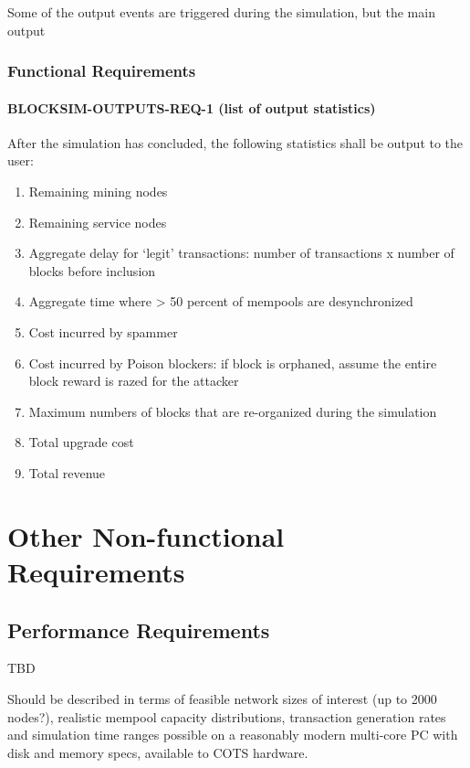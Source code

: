 \documentclass{scrreprt}
\begin{document}
Some of the output events are triggered during the simulation, but the
main output


\subsection{Functional Requirements}


\subsubsection{BLOCKSIM-OUTPUTS-REQ-1 (list of output statistics)}

After the simulation has concluded, the following statistics shall be output
to the user:

\begin{enumerate}
\item Remaining mining nodes
\item Remaining service nodes
\item Aggregate delay for `legit' transactions: number of transactions x number of blocks before inclusion
\item Aggregate time where > 50 percent of mempools are desynchronized
\item Cost incurred by spammer
\item Cost incurred by Poison blockers: if block is orphaned, assume the entire block reward is razed for the attacker
\item Maximum numbers of blocks that are re-organized during the simulation
\item Total upgrade cost
\item Total revenue
\end{enumerate}


\chapter{Other Non-functional Requirements}

\section{Performance Requirements}
TBD

Should be described in terms of feasible network sizes of interest (up to 2000 nodes?),
realistic mempool capacity distributions, transaction generation rates and simulation
time ranges possible on a reasonably modern multi-core PC with disk and memory specs,
available to COTS hardware.
\end{document}

